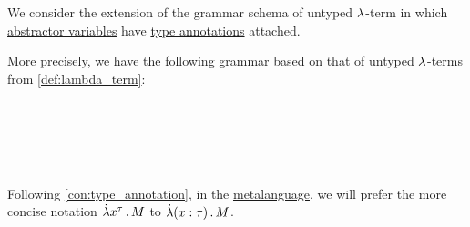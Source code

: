 \begin{definition}\label{def:typed_lambda_term}\mimprovised
  We consider the extension of the grammar schema of untyped \( {\mathrm \lambda} \)-term in which \hyperref[def:lambda_abstractor]{abstractor variables} have \hyperref[con:type_annotation]{type annotations} attached.

  More precisely, we have the following grammar based on that of untyped \( {\mathrm \lambda} \)-terms from \cref{def:lambda_term}:
  \begin{bnf*}
     { \bnfsp \bnftsq{:} \bnfsp {}} \\
                   { \bnfsp {}} \\
      {\bnftsq{\( ( \)} \bnfsp {} \bnfsp {} \bnfsp \bnftsq{\( ) \)}} \\
      {\bnftsq{\( ( \)} \bnfsp \bnftsq{\( \synlambda \)} \bnfsp {} \bnfsp {} \bnfsp {} \bnfsp \bnftsq{\( ) \)}} \\
             { \bnfor {} \bnfor {}}
  \end{bnf*}

  Following \cref{con:type_annotation}, in the \hyperref[con:metalanguage]{metalanguage}, we will prefer the more concise notation \( \qabs {x^\tau} M \) to \( \qabs {(x: \tau)} M \).
\end{definition}
